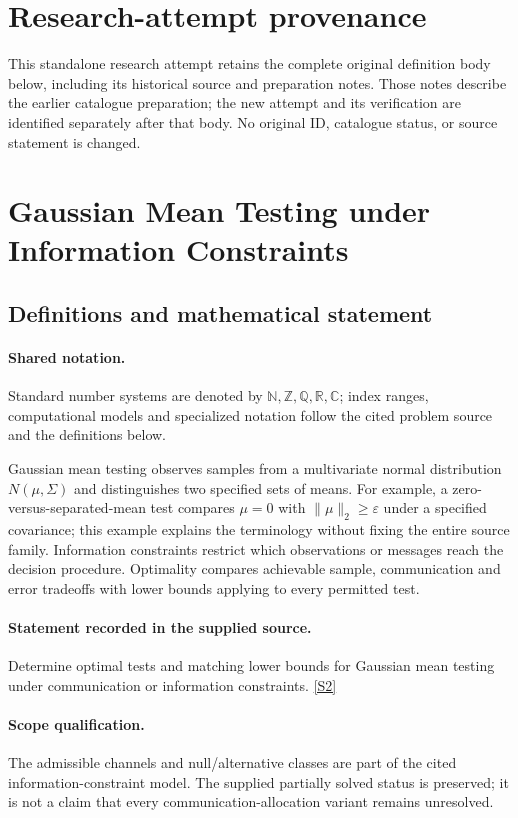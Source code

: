 \documentclass[11pt]{article}
\begin{document}
\section*{Research-attempt provenance}
This standalone research attempt retains the complete original definition body below,
including its historical source and preparation notes. Those notes describe the
earlier catalogue preparation; the new attempt and its verification are identified
separately after that body. No original ID, catalogue status, or source statement is changed.

\section{Gaussian Mean Testing under Information Constraints}\label{statement}

\subsection{Definitions and mathematical statement}

\paragraph{Shared notation.}Standard number systems are denoted by $\mathbb N,\mathbb Z,\mathbb Q,\mathbb R,\mathbb C$; index ranges, computational models and specialized notation follow the cited problem source and the definitions below.


Gaussian mean testing observes samples from a multivariate normal distribution $N(\mu,\Sigma)$ and distinguishes two specified sets of means. For example, a zero-versus-separated-mean test compares $\mu=0$ with $\lVert\mu\rVert_2\geq\varepsilon$ under a specified covariance; this example explains the terminology without fixing the entire source family. Information constraints restrict which observations or messages reach the decision procedure. Optimality compares achievable sample, communication and error tradeoffs with lower bounds applying to every permitted test.
\paragraph{Statement recorded in the supplied source.}
Determine optimal tests and matching lower bounds for Gaussian mean testing under communication or information constraints. \href{https://doi.org/10.4171/owr/2022/14}{[S2]}
\paragraph{Scope qualification.}
The admissible channels and null/alternative classes are part of the cited information-constraint model. The supplied partially solved status is preserved; it is not a claim that every communication-allocation variant remains unresolved.
\end{document}
